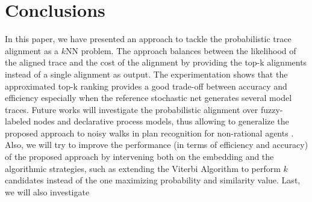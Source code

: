 
\section{Conclusions}
\label{sec:conclusion}

In this paper, we have presented an approach to tackle the probabilistic trace alignment as a $k$NN problem.
The approach balances between the likelihood of the aligned trace and the cost of the alignment by providing the top-k alignments instead of a single alignment as output. The experimentation shows that the approximated top-k ranking provides a good trade-off between accuracy and efficiency especially when the reference stochastic net generates several model traces.
Future works will investigate the probabilistic alignment over fuzzy-labeled nodes and declarative process models, thus allowing to generalize the proposed approach to noisy walks in plan recognition for non-rational agents \cite{RamirezG10}. Also, we will try to improve the performance (in terms of efficiency and accuracy) of the proposed approach by intervening both on the embedding and the algorithmic strategies, such as extending the Viterbi Algorithm \cite{Viterbi67} to perform $k$ candidates instead of the one maximizing probability and similarity value. Last, we will also investigate 


